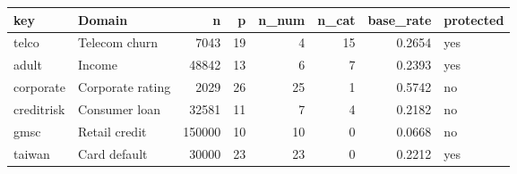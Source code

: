 \begin{tabular}{llrrrrrl}
\toprule
key & Domain & n & p & n\_num & n\_cat & base\_rate & protected \\
\midrule
telco & Telecom churn & 7043 & 19 & 4 & 15 & 0.2654 & yes \\
adult & Income & 48842 & 13 & 6 & 7 & 0.2393 & yes \\
corporate & Corporate rating & 2029 & 26 & 25 & 1 & 0.5742 & no \\
creditrisk & Consumer loan & 32581 & 11 & 7 & 4 & 0.2182 & no \\
gmsc & Retail credit & 150000 & 10 & 10 & 0 & 0.0668 & no \\
taiwan & Card default & 30000 & 23 & 23 & 0 & 0.2212 & yes \\
\bottomrule
\end{tabular}

